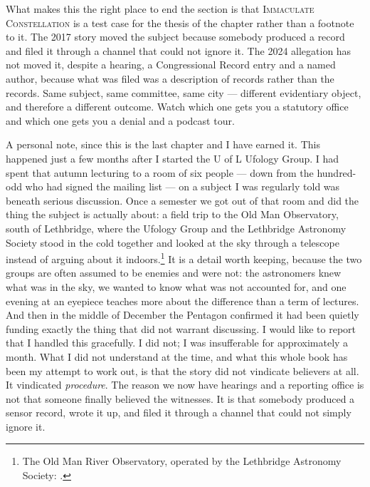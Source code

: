 What makes this the right place to end the section is that \textsc{Immaculate Constellation} is a test
case for the thesis of the chapter rather than a footnote to it. The 2017 story moved the subject because
somebody produced a record and filed it through a channel that could not ignore it. The 2024 allegation
has not moved it, despite a hearing, a Congressional Record entry and a named author, because what was
filed was a description of records rather than the records. Same subject, same committee, same city ---
different evidentiary object, and therefore a different outcome. Watch which one gets you a statutory
office and which one gets you a denial and a podcast tour.

A personal note, since this is the last chapter and I have earned it. This happened just a few months
after I started the U of L Ufology Group. I had spent that autumn lecturing to a room of six people ---
down from the hundred-odd who had signed the mailing list --- on a subject I was regularly told was
beneath serious discussion. Once a semester we got out of that room and did the thing the subject is
actually about: a field trip to the Old Man Observatory, south of Lethbridge, where the Ufology Group
and the Lethbridge Astronomy Society stood in the cold together and looked at the sky through a
telescope instead of arguing about it indoors.\footnote{The Old Man River Observatory, operated by the
Lethbridge Astronomy Society: .}
It is a detail worth keeping, because the two groups are often assumed to be enemies and were not:
the astronomers knew what was in the sky, we wanted to know what was not accounted for, and one
evening at an eyepiece teaches more about the difference than a term of lectures. And then in the middle of December the Pentagon confirmed it had been
quietly funding exactly the thing that did not warrant discussing. I would like to report that I
handled this gracefully. I did not; I was insufferable for approximately a month. What I did not
understand at the
time, and what this whole book has been my attempt to work out, is that the story did not vindicate
believers at all. It vindicated \emph{procedure}. The reason we now have hearings and a reporting
office is not that someone finally believed the witnesses. It is that somebody produced a sensor
record, wrote it up, and filed it through a channel that could not simply ignore it.


